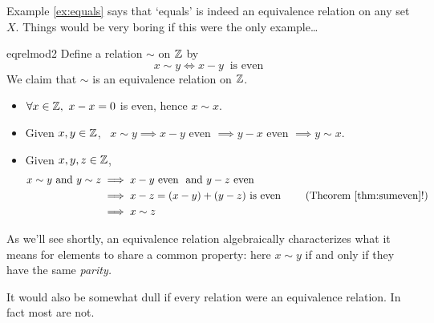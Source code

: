 \smallbreak

Example \ref{ex:equals} says that `equals' is indeed an equivalence relation on any set $X$. Things would be very boring if this were the only example\ldots


\begin{example}{}{eqrelmod2}
	Define a relation $\sim$ on $\mathbb{Z}$ by
	\[
		x\sim y\iff x-y\ \text{ is even} \tag{otherwise said, $x\equiv y\spmod 2$}
	\]
	We claim that $\sim$ is an equivalence relation on $\mathbb{Z}$.
	\begin{itemize}
		\item[] $\forall x\in\mathbb{Z},\ x-x=0$ is even, hence $x\sim x$.
		\item[]\eqsymm Given $x,y\in\mathbb{Z}$, \ $x\sim y\implies x-y$ even $\implies y-x$ even $\implies y\sim x$.
		\item[]\eqtrans Given $x,y,z\in\mathbb{Z}$,
		\begin{align*}
			x\sim y \text{ and } y\sim z
			&\implies x-y\text{ even \ and }y-z\text{ even }\\
			&\implies x-z=(x-y)+(y-z)\text{ is even } \tag{Theorem \ref{thm:sumeven}!}\\
			&\implies x\sim z
		\end{align*}
	\end{itemize}
As we'll see shortly, an equivalence relation algebraically characterizes what it means for elements to share a common property: here $x\sim y$ if and only if they have the same \emph{parity.}
\end{example}

\goodbreak


It would also be somewhat dull if every relation were an equivalence relation. In fact most are not.

